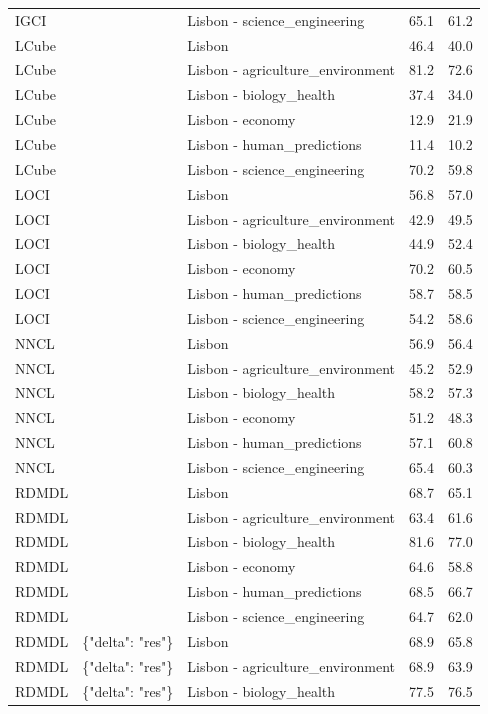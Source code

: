 \begin{tabular}{lllll}
IGCI &  & Lisbon - science\_engineering & 65.1 & 61.2 \\
LCube &  & Lisbon & 46.4 & 40.0 \\
LCube &  & Lisbon - agriculture\_environment & 81.2 & 72.6 \\
LCube &  & Lisbon - biology\_health & 37.4 & 34.0 \\
LCube &  & Lisbon - economy & 12.9 & 21.9 \\
LCube &  & Lisbon - human\_predictions & 11.4 & 10.2 \\
LCube &  & Lisbon - science\_engineering & 70.2 & 59.8 \\
LOCI &  & Lisbon & 56.8 & 57.0 \\
LOCI &  & Lisbon - agriculture\_environment & 42.9 & 49.5 \\
LOCI &  & Lisbon - biology\_health & 44.9 & 52.4 \\
LOCI &  & Lisbon - economy & 70.2 & 60.5 \\
LOCI &  & Lisbon - human\_predictions & 58.7 & 58.5 \\
LOCI &  & Lisbon - science\_engineering & 54.2 & 58.6 \\
NNCL &  & Lisbon & 56.9 & 56.4 \\
NNCL &  & Lisbon - agriculture\_environment & 45.2 & 52.9 \\
NNCL &  & Lisbon - biology\_health & 58.2 & 57.3 \\
NNCL &  & Lisbon - economy & 51.2 & 48.3 \\
NNCL &  & Lisbon - human\_predictions & 57.1 & 60.8 \\
NNCL &  & Lisbon - science\_engineering & 65.4 & 60.3 \\
RDMDL &  & Lisbon & 68.7 & 65.1 \\
RDMDL &  & Lisbon - agriculture\_environment & 63.4 & 61.6 \\
RDMDL &  & Lisbon - biology\_health & 81.6 & 77.0 \\
RDMDL &  & Lisbon - economy & 64.6 & 58.8 \\
RDMDL &  & Lisbon - human\_predictions & 68.5 & 66.7 \\
RDMDL &  & Lisbon - science\_engineering & 64.7 & 62.0 \\
RDMDL & \{"delta": "res"\} & Lisbon & 68.9 & 65.8 \\
RDMDL & \{"delta": "res"\} & Lisbon - agriculture\_environment & 68.9 & 63.9 \\
RDMDL & \{"delta": "res"\} & Lisbon - biology\_health & 77.5 & 76.5 \\

\end{tabular}
